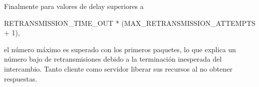 Finalmente para valores de delay superiores a 

RETRANSMISSION\_TIME\_OUT * (MAX\_RETRANSMISSION\_ATTEMPTS + 1), 

el número máximo es superado con los primeros paquetes, lo que explica un número bajo de retransmisiones debido
a la terminación inesperada del intercambio. Tanto cliente como servidor liberar sus recursos al no obtener respuestas.
